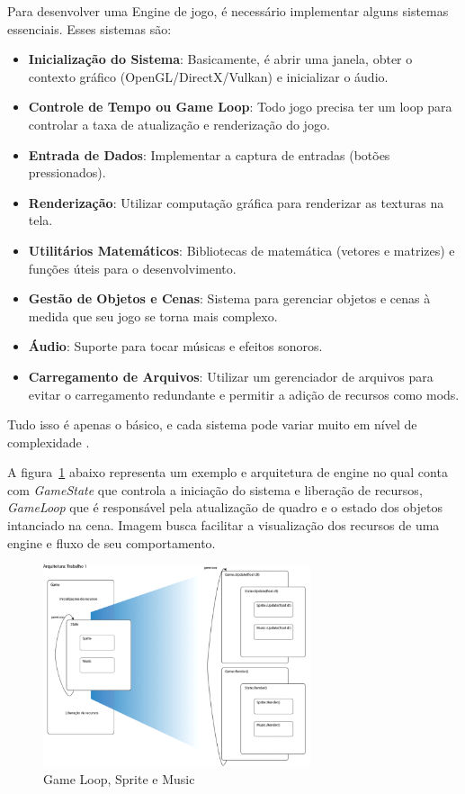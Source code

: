 Para desenvolver uma Engine de jogo, é necessário implementar alguns sistemas essenciais. Esses sistemas são:

\begin{itemize}
  \item \textbf{Inicialização do Sistema}: Basicamente, é abrir uma janela, obter o contexto gráfico (OpenGL/DirectX/Vulkan) e inicializar o áudio.
  \item \textbf{Controle de Tempo ou Game Loop}: Todo jogo precisa ter um loop para controlar a taxa de atualização e renderização do jogo.
  \item \textbf{Entrada de Dados}: Implementar a captura de entradas (botões pressionados).
  \item \textbf{Renderização}: Utilizar computação gráfica para renderizar as texturas na tela.
  \item \textbf{Utilitários Matemáticos}: Bibliotecas de matemática (vetores e matrizes) e funções úteis para o desenvolvimento.
  \item \textbf{Gestão de Objetos e Cenas}: Sistema para gerenciar objetos e cenas à medida que seu jogo se torna mais complexo.
  \item \textbf{Áudio}: Suporte para tocar músicas e efeitos sonoros.
  \item \textbf{Carregamento de Arquivos}: Utilizar um gerenciador de arquivos para evitar o carregamento redundante e permitir a adição de recursos como mods.
\end{itemize}

Tudo isso é apenas o básico, e cada sistema pode variar muito em nível de complexidade .

A figura~\ref{fig:GSM} abaixo representa um exemplo e arquitetura de engine no qual conta com \textit{GameState} que controla a iniciação do sistema e liberação de recursos, \textit{GameLoop} que é responsável pela atualização de quadro e o estado dos objetos intanciado na cena. Imagem busca facilitar a visualização dos recursos de uma engine e fluxo de seu comportamento.

\begin{figure}[htbp]
    \centering
    \caption{Game Loop, Sprite e Music}
    \label{fig:GSM}
    \includegraphics[width=0.7\textwidth]{figuras/cic-engine.png}
\end{figure}

